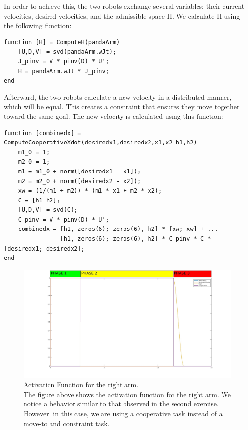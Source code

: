 \documentclass{article}
\begin{document}
In order to achieve this, the two robots exchange several variables: their current velocities, desired velocities, and the admissible space H. We calculate H using the following function:

\begin{verbatim}
function [H] = ComputeH(pandaArm)
    [U,D,V] = svd(pandaArm.wJt);
    J_pinv = V * pinv(D) * U';
    H = pandaArm.wJt * J_pinv;
end
\end{verbatim}

Afterward, the two robots calculate a new velocity in a distributed manner, which will be equal. This creates a constraint that ensures they move together toward the same goal. The new velocity is calculated using this function:

\begin{verbatim}
function [combinedx] = ComputeCooperativeXdot(desiredx1,desiredx2,x1,x2,h1,h2)
    m1_0 = 1;
    m2_0 = 1;
    m1 = m1_0 + norm([desiredx1 - x1]);
    m2 = m2_0 + norm([desiredx2 - x2]);
    xw = (1/(m1 + m2)) * (m1 * x1 + m2 * x2);
    C = [h1 h2];
    [U,D,V] = svd(C);
    C_pinv = V * pinv(D) * U';
    combinedx = [h1, zeros(6); zeros(6), h2] * [xw; xw] + ...
                [h1, zeros(6); zeros(6), h2] * C_pinv * C * [desiredx1; desiredx2];
end
\end{verbatim}


\begin{figure}[h]
    \centering
    \includegraphics[width=1\textwidth]{imgs/ex3/activation right.jpg}
    \caption{Activation Function for the right arm.\\
	The figure above shows the activation function for the right arm. We notice a behavior similar to that observed in the second exercise. However, in this case, we are using a cooperative task instead of a move-to and constraint task.
}
\end{figure}
\end{document}
